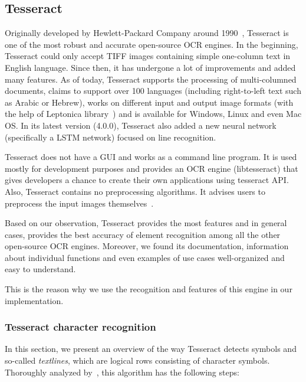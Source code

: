 \subsection{Tesseract}

Originally developed by Hewlett-Packard Company around 1990~\citep{TesseractGIT}, Tesseract is one of the most robust and accurate open-source OCR engines. In the beginning, Tesseract could only accept TIFF images containing simple one-column text in English language. Since then, it has undergone a lot of improvements and added many features. As of today, Tesseract supports the processing of multi-columned documents, claims to support over 100 languages (including right-to-left text such as Arabic or Hebrew), works on different input and output image formats (with the help of Leptonica library~\citep{LeptonicaLIB}) and is available for Windows, Linux and even Mac OS. In its latest version (4.0.0), Tesseract also added a new neural network (specifically a LSTM network) focused on line recognition. 

Tesseract does not have a GUI and works as a command line program. It is used mostly for development purposes and provides an OCR engine (libtesseract) that gives developers a chance to create their own applications using tesseract API. Also, Tesseract contains no preprocessing algorithms. It advises users to preprocess the input images themselves~\citep{TesseractQual}.

Based on our observation, Tesseract provides the most features and in general cases, provides the best accuracy of element recognition among all the other open-source OCR engines. Moreover, we found its documentation, information about individual functions and even examples of use cases well-organized and easy to understand.

This is the reason why we use the recognition and features of this engine in our implementation.

\subsubsection{Tesseract character recognition} \label{tesseractCharacterRecognition}

In this section, we present an overview of the way Tesseract detects symbols and so-called \emph{textlines}, which are logical rows consisting of character symbols. Thoroughly analyzed by~\citet{smith2007overview}, this algorithm has the following steps:

